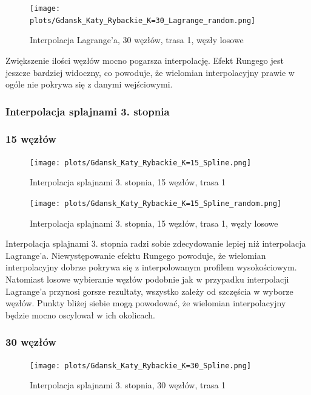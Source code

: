 \documentclass{article}
\begin{document}
\begin{figure}[H]
    \centering
    \texttt{[image: plots/Gdansk\_Katy\_Rybackie\_K=30\_Lagrange\_random.png]}
    \caption{Interpolacja Lagrange'a, 30 węzłów, trasa 1, węzły losowe}
\end{figure}

Zwiększenie ilości węzłów mocno pogarsza interpolację. Efekt Rungego jest jeszcze bardziej widoczny,
co powoduje, że wielomian interpolacyjny prawie w ogóle nie pokrywa się z danymi wejściowymi.

\subsubsection{Interpolacja splajnami 3. stopnia}

\subsubsection*{\hfil 15 węzłów \hfil }
\begin{figure}[H]
    \centering
    \texttt{[image: plots/Gdansk\_Katy\_Rybackie\_K=15\_Spline.png]}
    \caption{Interpolacja splajnami 3. stopnia, 15 węzłów, trasa 1}
\end{figure}

\begin{figure}[H]
    \centering
    \texttt{[image: plots/Gdansk\_Katy\_Rybackie\_K=15\_Spline\_random.png]}
    \caption{Interpolacja splajnami 3. stopnia, 15 węzłów, trasa 1, węzły losowe}
\end{figure}

Interpolacja splajnami 3. stopnia radzi sobie zdecydowanie lepiej niż interpolacja Lagrange'a.
Niewystępowanie efektu Rungego powoduje, że wielomian interpolacyjny dobrze pokrywa się z interpolowanym profilem
wysokościowym. Natomiast losowe wybieranie węzłów podobnie jak w przypadku interpolacji Lagrange'a
przynosi gorsze rezultaty, wszystko zależy od szczęścia w wyborze węzłów. Punkty bliżej siebie
mogą powodować, że wielomian interpolacyjny będzie mocno oscylował w ich okolicach.


\subsubsection*{\hfil 30 węzłów \hfil }
\begin{figure}[H]
    \centering
    \texttt{[image: plots/Gdansk\_Katy\_Rybackie\_K=30\_Spline.png]}
    \caption{Interpolacja splajnami 3. stopnia, 30 węzłów, trasa 1}
\end{figure}
\end{document}
